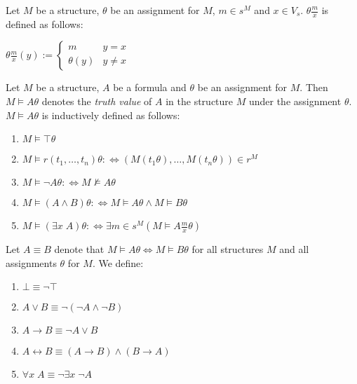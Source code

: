 \begin{Def} Let $M$ be a structure, $\theta$ be an assignment for $M$, $m \in s^M$ and 
$x \in V_s$. $\theta\frac{m}{x}$ is defined as follows:

\begin{center}
$\theta\frac{m}{x}(y) := \left\{ \begin{array}{ll} m & y=x \\
\theta(y) & y\not=x \end{array} \right.$
\end{center}
\end{Def}

\begin{Def} Let $M$ be a structure, $A$ be a formula and $\theta$ be an assignment for $M$. 
Then $M \models A\theta$ denotes the {\em truth value} of $A$ in the structure $M$ under 
the assignment $\theta$. $M \models A\theta$ is inductively defined as follows:
\begin{enumerate}
\item $M\models \top\theta$
\item $M\models r(t_1,\ldots,t_n)\theta:\Longleftrightarrow 
(M(t_1\theta),\ldots,M(t_n\theta)) \in r^M$
\item $M\models \neg A\theta :\Longleftrightarrow M\not\models A\theta$
\item $M\models (A \wedge B)\theta:\Longleftrightarrow M\models A\theta \wedge M\models B\theta$
\item $M\models (\exists x\;A)\theta:\Longleftrightarrow \exists m \in s^M
(M\models A\frac{m}{x}\theta)$
\end{enumerate}
\end{Def}

\begin{Def} Let $A \equiv B$ denote that $M\models A\theta \Longleftrightarrow M\models B\theta$ 
for all structures $M$ and all assignments $\theta$ for $M$. We define:
\begin{enumerate}
\item $\bot \equiv \neg \top$
\item $A \vee B\equiv \neg(\neg A \wedge \neg B)$
\item $A \rightarrow B\equiv \neg A \vee B$
\item $A \leftrightarrow B\equiv (A \rightarrow B) \wedge (B \rightarrow A)$
\item $\forall x\;A\equiv \neg \exists x\; \neg A$
\end{enumerate}
\end{Def}

